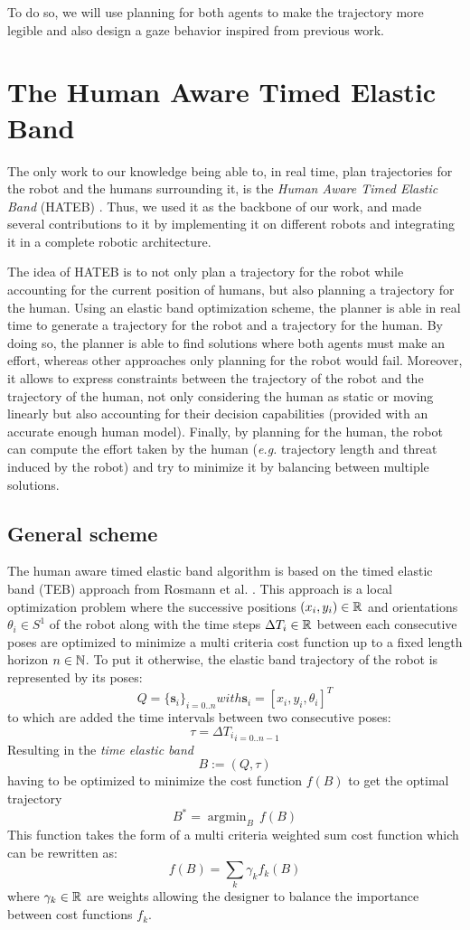\documentclass[a4paper,11pt,twoside]{StyleThese}
\begin{document}
To do so, we will use planning for both agents to make the trajectory more legible and also design a gaze behavior inspired from previous work.



\section{The Human Aware Timed Elastic Band}
The only work to our knowledge being able to, in real time, plan trajectories for the robot and the humans surrounding it, is the \textit{Human Aware Timed Elastic Band} (HATEB) \cite{khambhaita_viewing_2017}. Thus, we used it as the backbone of our work, and made several contributions to it by implementing it on different robots and integrating it in a complete robotic architecture.

The idea of HATEB is to not only plan a trajectory for the robot while accounting for the current position of humans, but also planning a trajectory for the human. Using an elastic band optimization scheme, the planner is able in real time to generate a trajectory for the robot and a trajectory for the human. By doing so, the planner is able to find solutions where both agents must make an effort, whereas other approaches only planning for the robot would fail. Moreover, it allows to express constraints between the trajectory of the robot and the trajectory of the human, not only considering the human as static or moving linearly but also accounting for their decision capabilities (provided with an accurate enough human model). Finally, by planning for the human, the robot can compute the effort taken by the human (\textit{e.g.} trajectory length and threat induced by the robot) and try to minimize it by balancing between multiple solutions.

\subsection{General scheme}
The human aware timed elastic band algorithm is based on the timed elastic band (TEB) approach from Rosmann et al. \cite{rosmann_efficient_2013}. This approach is a local optimization problem where the successive positions $(x_i, y_i) \in \mathbb{R}$ and orientations $\theta_i \in S^1$ of the robot along with the time steps $\Delta T_i \in \mathbb{R}$ between each consecutive poses are optimized to minimize a multi criteria cost function up to a fixed length horizon $n \in \mathbb{N}$. To put it otherwise, the elastic band trajectory of the robot is represented by its poses: 
\[Q = \{\textbf{s}_i\}_{i=0..n} with \textbf{s}_i = [x_i, y_i, \theta_i]^T\] to which are added the time intervals between two consecutive poses: \[\tau = {\Delta T_i}_{i=0..n-1}\] Resulting in the \textit{time elastic band} \[B := (Q, \tau)\] having to be optimized to minimize the cost function $f(B)$ to get the optimal trajectory \[B^* = \mathop{\mathrm{argmin}}_B\,f(B)\]
This function takes the form of a multi criteria weighted sum cost function which can be rewritten as: \[ f(B) = \sum_{k} \gamma_k f_k(B) \] where $\gamma_k \in \mathbb{R}$ are weights allowing the designer to balance the importance between cost functions $f_k$.
\end{document}
